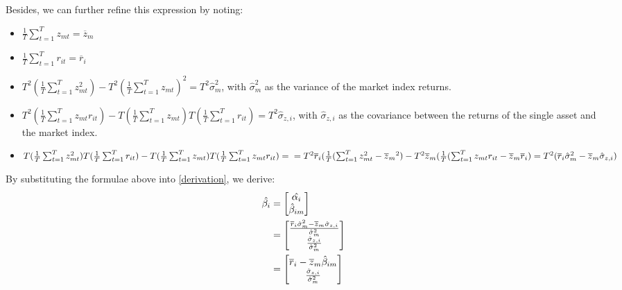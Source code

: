\documentclass[12pt]{article}
\begin{document}
Besides, we can further refine this expression by noting:
\begin{itemize}
\item $\frac{1}{T}\sum_{t=1}^{T}z_{mt} =\overline{z}_m $
\item $\frac{1}{T}\sum_{t=1}^{T}r_{it} =\overline{r}_i $
\item $T^2(\frac{1}{T}\sum_{t=1}^{T}z_{mt}^2)-T^2(\frac{1}{T}\sum_{t=1}^{T}z_{mt})^2 = T^2\hat{\sigma}_{m}^2 $, with $\hat{\sigma}_{m}^2$ as the variance of the market index returns.
\item $T^2(\frac{1}{T}\sum_{t=1}^{T}z_{mt}r_{it}) - T(\frac{1}{T}\sum_{t=1}^{T}z_{mt}) T(\frac{1}{T}\sum_{t=1}^{T}r_{it}) = T^2\hat{\sigma}_{z,i}$, with $\hat{\sigma}_{z,i} $ as the covariance between the returns of the single asset and the market index.
\item $T(\frac{1}{T}\sum_{t=1}^{T}z_{mt}^2) T(\frac{1}{T}\sum_{t=1}^{T}r_{it}) - T(\frac{1}{T}\sum_{t=1}^{T}z_{mt})T(\frac{1}{T}\sum_{t=1}^{T}z_{mt}r_{it}) = \\ 
= T^2\overline{r}_i(\frac{1}{T}(\sum_{t=1}^{T}z_{mt}^2-\overline{z}_m{^2})- T^2\overline{z}_m(\frac{1}{T}(\sum_{t=1}^{T}z_{mt}r_{it}-\overline{z}_m\overline{r}_i) \\
= T^2(\overline{r}_i\hat{\sigma}_{m}^2 -\overline{z}_m\hat{\sigma}_{z,i})$
\end{itemize}
By substituting the formulae above into \ref{derivation}, we derive:
\begin{align}
			\hat{\beta_i} &= \begin{bmatrix} \hat{\alpha_i} \\ \hat{\beta}_{im} \end{bmatrix} \notag \\
 			&= \begin{bmatrix} \frac{\overline{r}_i\hat{\sigma}_{m}^2-\overline{z}_m\hat{\sigma}_{z,i}}{\hat{\sigma}_{m}^2} \\ \frac{\hat{\sigma}_{z,i}}{\hat{\sigma}_{m}^2} \end{bmatrix} \notag \\
 			&= \begin{bmatrix} \overline{r}_i - \overline{z}_m\hat{\beta}_{im} \\ \frac{\hat{\sigma}_{z,i}}{\hat{\sigma}_{m}^2} \end{bmatrix}
\end{align}
\end{document}
